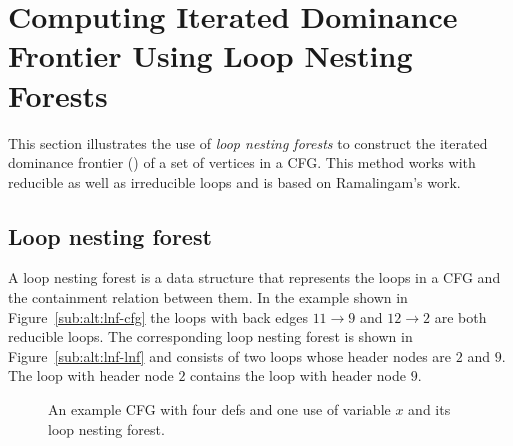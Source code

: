 {\begin{algorithm}
\end{algorithm}

%
%


\section{Computing Iterated Dominance Frontier Using Loop Nesting Forests}
\label{section:alternative_ssa_construction_algorithms:loop}
This section illustrates the use of \emph{loop nesting forests} to construct 
the iterated dominance frontier (\iDF) of a set of vertices in a CFG. This 
method works with reducible as well as irreducible loops and is based on 
Ramalingam's work.


\subsection{Loop nesting forest}%
A loop nesting forest
is a data structure that represents the loops in a CFG and the containment relation between them. 
In the example shown in Figure~\ref{sub:alt:lnf-cfg} the loops with back edges $11 \rightarrow 9$ and $12 \rightarrow 2$ are both reducible loops.
The corresponding loop nesting forest is shown in Figure~\ref{sub:alt:lnf-lnf} and consists of two loops whose header nodes are $2$ and $9$.
The loop with header node $2$ contains the loop with header node $9$.

    \begin{figure}[htb]
    \hfill
    \hfill
    \hfill\null
    \caption{An example CFG with four defs and one use of variable $x$ and its loop nesting forest.}
    \label{fig:lnf}
    \end{figure} 


}
